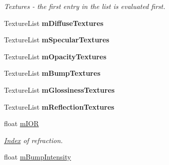 \begin{DoxyCompactItemize}
\begin{DoxyCompactList}\small\item\em Textures -\/ the first entry in the list is evaluated first. \end{DoxyCompactList}\item 
\hypertarget{struct_assimp_1_1_l_w_o_1_1_surface_acf65229aa58d41c2e2ab5d57dc6e7389}{Texture\+List {\bfseries m\+Diffuse\+Textures}}\label{struct_assimp_1_1_l_w_o_1_1_surface_acf65229aa58d41c2e2ab5d57dc6e7389}

\item 
\hypertarget{struct_assimp_1_1_l_w_o_1_1_surface_ae762d7ad46bf2b4db8c38b3fe3dacbac}{Texture\+List {\bfseries m\+Specular\+Textures}}\label{struct_assimp_1_1_l_w_o_1_1_surface_ae762d7ad46bf2b4db8c38b3fe3dacbac}

\item 
\hypertarget{struct_assimp_1_1_l_w_o_1_1_surface_af3d9e28b3fb64623770ddc1158445bc3}{Texture\+List {\bfseries m\+Opacity\+Textures}}\label{struct_assimp_1_1_l_w_o_1_1_surface_af3d9e28b3fb64623770ddc1158445bc3}

\item 
\hypertarget{struct_assimp_1_1_l_w_o_1_1_surface_a13214f57269b9526b91ef2f85f550734}{Texture\+List {\bfseries m\+Bump\+Textures}}\label{struct_assimp_1_1_l_w_o_1_1_surface_a13214f57269b9526b91ef2f85f550734}

\item 
\hypertarget{struct_assimp_1_1_l_w_o_1_1_surface_a8ffe2d4682aad71131b13ca03bfe04ea}{Texture\+List {\bfseries m\+Glossiness\+Textures}}\label{struct_assimp_1_1_l_w_o_1_1_surface_a8ffe2d4682aad71131b13ca03bfe04ea}

\item 
\hypertarget{struct_assimp_1_1_l_w_o_1_1_surface_af94ebbf256ebc2f9a00e55d2d58bca96}{Texture\+List {\bfseries m\+Reflection\+Textures}}\label{struct_assimp_1_1_l_w_o_1_1_surface_af94ebbf256ebc2f9a00e55d2d58bca96}

\item 
\hypertarget{struct_assimp_1_1_l_w_o_1_1_surface_a386a3b05172173a674e5734af1f09e48}{float \hyperlink{struct_assimp_1_1_l_w_o_1_1_surface_a386a3b05172173a674e5734af1f09e48}{m\+I\+O\+R}}\label{struct_assimp_1_1_l_w_o_1_1_surface_a386a3b05172173a674e5734af1f09e48}

\begin{DoxyCompactList}\small\item\em \hyperlink{struct_index}{Index} of refraction. \end{DoxyCompactList}\item 
\hypertarget{struct_assimp_1_1_l_w_o_1_1_surface_ac7805adf612a301775385bd94ec44f8a}{float \hyperlink{struct_assimp_1_1_l_w_o_1_1_surface_ac7805adf612a301775385bd94ec44f8a}{m\+Bump\+Intensity}}\label{struct_assimp_1_1_l_w_o_1_1_surface_ac7805adf612a301775385bd94ec44f8a}


\end{DoxyCompactItemize}

